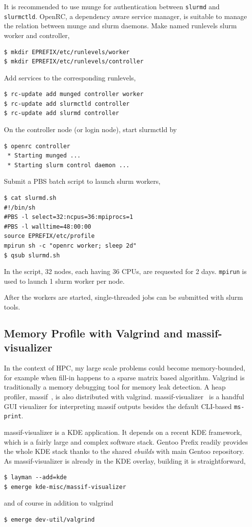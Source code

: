 \documentclass[a4paper,conference]{IEEEtran}
\begin{document}
It is recommended to use munge for authentication between
\texttt{slurmd} and \texttt{slurmctld}.  OpenRC, a dependency aware
service manager, is suitable to manage the relation between munge and
slurm daemons.  Make named runlevels slurm worker and controller,
\begin{verbatim}
$ mkdir EPREFIX/etc/runlevels/worker
$ mkdir EPREFIX/etc/runlevels/controller
\end{verbatim}
Add services to the corresponding runlevels,
\begin{verbatim}
$ rc-update add munged controller worker
$ rc-update add slurmctld controller
$ rc-update add slurmd controller
\end{verbatim}
On the controller node (or login node), start slurmctld by
\begin{verbatim}
$ openrc controller
 * Starting munged ...
 * Starting slurm control daemon ...
\end{verbatim}
Submit a PBS batch script to launch slurm workers,
\begin{verbatim}
$ cat slurmd.sh
#!/bin/sh
#PBS -l select=32:ncpus=36:mpiprocs=1
#PBS -l walltime=48:00:00
source EPREFIX/etc/profile
mpirun sh -c "openrc worker; sleep 2d"
$ qsub slurmd.sh
\end{verbatim}
In the script, 32 nodes, each having 36 CPUs, are requested for 2
days. \texttt{mpirun} is used to launch 1 slurm worker per node.

After the workers are started, single-threaded jobs can be submitted
with slurm tools.

\subsection{Memory Profile with Valgrind and massif-visualizer}
\label{sec:massif}
In the context of HPC, my large scale problems could become
memory-bounded, for example when fill-in happens to a sparse matrix
based algorithm.  Valgrind is traditionally a memory debugging tool
for memory leak detection.  A heap profiler, massif~\cite{massif}, is
also distributed with valgrind.
massif-visualizer~\cite{massif:visualizer} is a handful GUI visualizer
for interpreting massif outputs besides the default CLI-based
\texttt{ms-print}.

massif-visualizer is a KDE application.  It depends on a recent KDE
framework, which is a fairly large and complex software stack.  Gentoo
Prefix readily provides the whole KDE stack thanks to the shared
\textit{ebuilds} with main Gentoo repository.  As massif-visualizer is
already in the KDE overlay, building it is straightforward,
\begin{verbatim}
$ layman --add=kde
$ emerge kde-misc/massif-visualizer
\end{verbatim}
and of course in addition to valgrind
\begin{verbatim}
$ emerge dev-util/valgrind
\end{verbatim}
\end{document}
